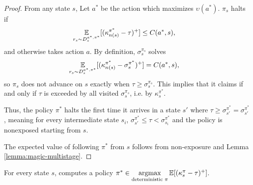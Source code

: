 \begin{proof}
	From any state $s$, Let $a^*$ be the action which maximizes $\upsilon(a^*)$.
	$\pi_s$ halts if
	\begin{align*}
		 \operatorname*{\mathbb{E}}_{r_s \sim D_{s}^{a^*,\pi^*}}[(\kappa^{\pi^*}_{n(s)}-\tau)^+] &\leq C(a^*,s),
	\end{align*}
	and otherwise takes action $a$.
	By definition, $\sigma_s^{\pi_s}$ solves
	\begin{align*}
		\operatorname*{\mathbb{E}}_{r_s \sim D_{s}^{a^*,\pi^*}}[(\kappa^{\pi^*}_{n(s)}-\sigma_s^{\pi^*})^+] &= C(a^*,s),
	\end{align*}
	so $\pi_s$ does not advance on $s$ exactly when $\tau \geq \sigma_s^{\pi_s}$.
	This implies that it claims if and only if $\tau$ is exceeded by all visited $\sigma_s^{\pi_s}$, i.e. by $\kappa^{\pi^*}_s$.

	Thus, the policy $\pi^*$ halts the first time it arrives in a state $s'$ where $\tau \geq \sigma_{s'}^{\pi^*} = \sigma_{s'}^{\pi^*}$, meaning for every intermediate state $s_i$, $\sigma_{s'}^{\pi^*} \leq \tau < \sigma_{s_i}^{\pi^*}$ and the policy is nonexposed starting from $s$.

	The expected value of following $\pi^*$ from $s$ follows from non-exposure and Lemma \ref{lemma:magic-multistage}.
\end{proof}

\begin{lemma}\label{lemma:maxsaup-maximal}
	For every state $s$, \MAXSAUP{} computes a policy $\pi^* \in \operatorname*{argmax}\limits_{\text{deterministic } \pi} \operatorname*{\mathbb{E}}[(\kappa_{s}^{\pi} - \tau)^+]$.
\end{lemma}

